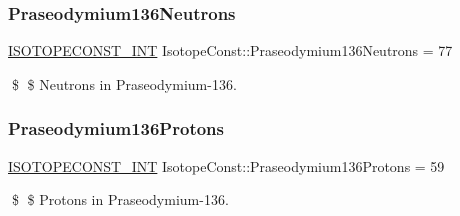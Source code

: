 \subsubsection{\texorpdfstring{Praseodymium136\+Neutrons}{Praseodymium136Neutrons}}
{\footnotesize\ttfamily \mbox{\hyperlink{group___isotope_const-_macros_ga5f18360b3e99483a35c32d789e62621c}{I\+S\+O\+T\+O\+P\+E\+C\+O\+N\+S\+T\+\_\+\+I\+NT}} Isotope\+Const\+::\+Praseodymium136\+Neutrons = 77}

\$ \$ Neutrons in Praseodymium-\/136. \mbox{\label{group___isotope_const-_praseodymium-_pr136_gaa5155ac8ea6a96d808312062d557c855}} 
\subsubsection{\texorpdfstring{Praseodymium136\+Protons}{Praseodymium136Protons}}
{\footnotesize\ttfamily \mbox{\hyperlink{group___isotope_const-_macros_ga5f18360b3e99483a35c32d789e62621c}{I\+S\+O\+T\+O\+P\+E\+C\+O\+N\+S\+T\+\_\+\+I\+NT}} Isotope\+Const\+::\+Praseodymium136\+Protons = 59}

\$ \$ Protons in Praseodymium-\/136. 